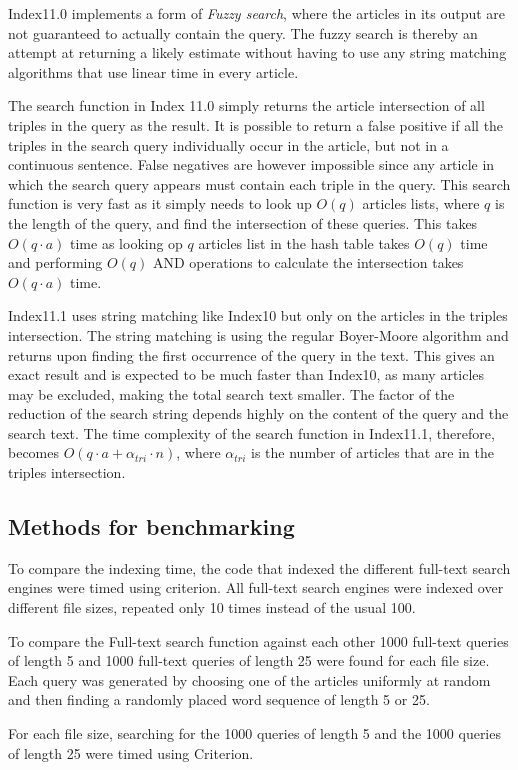 Index11.0 implements a form of \textit{Fuzzy search}, where the articles in its output are not guaranteed to actually contain the query. The fuzzy search is thereby an attempt at returning a likely estimate without having to use any string matching algorithms that use linear time in every article. 

The search function in Index 11.0 simply returns the article intersection of all triples in the query as the result. It is possible to return a false positive if all the triples in the search query individually occur in the article, but not in a continuous sentence. False negatives are however impossible since any article in which the search query appears must contain each triple in the query. This search function is very fast as it simply needs to look up $O(q)$ articles lists, where $q$ is the length of the query, and find the intersection of these queries. This takes $O(q\cdot a)$ time as looking op $q$ articles list in the hash table takes $O(q)$ time and performing $O(q)$ AND operations to calculate the intersection takes $O(q\cdot a)$ time.

Index11.1 uses string matching like Index10 but only on the articles in the triples intersection. The string matching is using the regular Boyer-Moore algorithm and returns upon finding the first occurrence of the query in the text. This gives an exact result and is expected to be much faster than Index10, as many articles may be excluded, making the total search text smaller. The factor of the reduction of the search string depends highly on the content of the query and the search text. The time complexity of the search function in Index11.1, therefore, becomes $O(q\cdot a + \alpha_{tri}\cdot n)$, where $\alpha_{tri}$ is the number of articles that are in the triples intersection. 

\subsection{Methods for benchmarking}
To compare the indexing time, the code that indexed the different full-text search engines were timed using criterion. All full-text search engines were indexed over different file sizes, repeated only 10 times instead of the usual 100.

To compare the Full-text search function against each other 1000 full-text queries of length 5 and 1000 full-text queries of length 25  were found for each file size. Each query was generated by choosing one of the articles uniformly at random and then finding a randomly placed word sequence of length 5 or 25. 

For each file size, searching for the 1000 queries of length 5 and the 1000 queries of length 25 were timed using Criterion.
